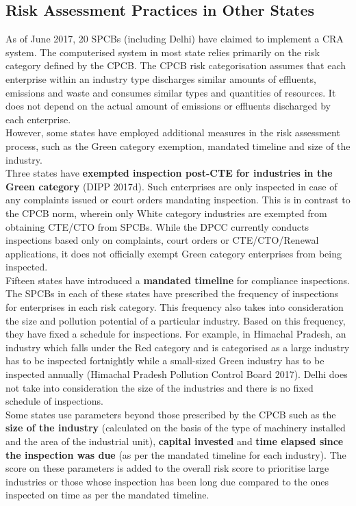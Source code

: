 \documentclass[a4paper, 12pt]{article}
\begin{document}
	\subsection{Risk Assessment Practices in Other States}
	
	As of June 2017, 20 SPCBs (including Delhi) have claimed to implement a CRA system. The computerised system in most state relies primarily on the risk category defined by the CPCB. The CPCB risk categorisation assumes that each enterprise within an industry type discharges similar amounts of effluents, emissions and waste and consumes similar types and quantities of resources. It does not depend on the actual amount of emissions or effluents discharged by each enterprise. \\
	
	However, some states have employed additional measures in the risk assessment process, such as the Green category exemption, mandated timeline and size of the industry. \\
	
	Three states have \textbf{exempted inspection post-CTE for industries in the Green category} (DIPP 2017d). Such enterprises are only inspected in case of any complaints issued or court orders mandating inspection. This is in contrast to the CPCB norm, wherein only White category industries are exempted from obtaining CTE/CTO from SPCBs. While the DPCC currently conducts inspections based only on complaints, court orders or CTE/CTO/Renewal applications, it does not officially exempt Green category enterprises from being inspected. \\
	
	Fifteen states have introduced a \textbf{mandated timeline} for compliance inspections. The SPCBs in each of these states have prescribed the frequency of inspections for enterprises in each risk category. This frequency also takes into consideration the size and pollution potential of a particular industry. Based on this frequency, they have fixed a schedule for inspections. For example, in Himachal Pradesh, an industry which falls under the Red category and is categorised as a large industry has to be inspected fortnightly while a small-sized Green industry has to be inspected annually (Himachal Pradesh Pollution Control Board 2017). Delhi does not take into consideration the size of the industries and there is no fixed schedule of inspections. \\
	
	Some states use parameters beyond those prescribed by the CPCB such as the \textbf{size of the industry} (calculated on the basis of the type of machinery installed and the area of the industrial unit), \textbf{capital invested} and \textbf{time elapsed since the inspection was due} (as per the mandated timeline for each industry). The score on these parameters is added to the overall risk score to prioritise large industries or those whose inspection has been long due compared to the ones inspected on time as per the mandated timeline. \\
	
\end{document}
